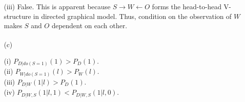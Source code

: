 \documentclass{article}
\newcommand{\qeds}{\hfill\qedsymbol}
\begin{document}
\noindent
(iii) False. This is apparent because $S \rightarrow W \leftarrow O$ forms the head-to-head V-structure in
directed graphical model. Thus, condition on the observation of $W$ makes $S$ and $O$ dependent on each other.\qeds
\\
\\

\noindent
(c)

(i) $P_{D|do(S=1)}(1) > P_D(1)$.
\\

(ii) $P_{W|do(S=1)}(l) > P_W(l)$.
\\

(iii) $P_{D|W}(1|l) > P_D(1)$.
\\

(iv) $P_{D|W, S}(1|l, 1) < P_{D|W, S}(1|l, 0)$.
\end{document}
